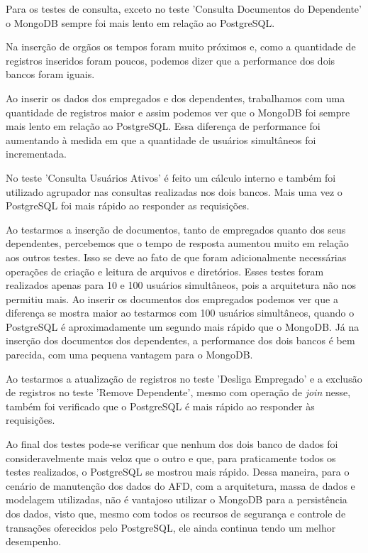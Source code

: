 Para os testes de consulta, exceto no teste 'Consulta Documentos do Dependente' o MongoDB sempre foi mais lento em relação ao PostgreSQL.

Na inserção de orgãos os tempos foram muito próximos e, como a quantidade de registros inseridos foram poucos, podemos dizer que a performance dos dois bancos foram iguais.

Ao inserir os dados dos empregados e dos dependentes, trabalhamos com uma quantidade de registros maior e assim podemos ver que o MongoDB foi sempre mais lento em relação ao PostgreSQL. Essa diferença de performance foi aumentando à medida em que a quantidade de usuários simultâneos foi incrementada.

No teste 'Consulta Usuários Ativos' é feito um cálculo interno e também foi utilizado agrupador nas consultas realizadas nos dois bancos. Mais uma vez o PostgreSQL foi mais rápido ao responder as requisições.

Ao testarmos a inserção de documentos, tanto de empregados quanto dos seus dependentes, percebemos que o tempo de resposta aumentou muito em relação aos outros testes. Isso se deve ao fato de que foram adicionalmente necessárias operações de criação e leitura de arquivos e diretórios. Esses testes foram realizados apenas para 10 e 100 usuários simultâneos, pois a arquitetura não nos permitiu mais. Ao inserir os documentos dos empregados podemos ver que a diferença se mostra maior ao testarmos com 100 usuários simultâneos, quando o PostgreSQL é aproximadamente um segundo mais rápido que o MongoDB. Já na inserção dos documentos dos dependentes, a performance dos dois bancos é bem parecida, com uma pequena vantagem para o MongoDB.

Ao testarmos a atualização de registros no teste 'Desliga Empregado' e a exclusão de registros no teste 'Remove Dependente', mesmo com operação de \textit{join} nesse, também foi verificado que o PostgreSQL é mais rápido ao responder às requisições.

Ao final dos testes pode-se verificar que nenhum dos dois banco de dados foi consideravelmente mais veloz que o outro e que, para praticamente todos os testes realizados, o PostgreSQL se mostrou mais rápido. Dessa maneira, para o cenário de manutenção dos dados do AFD, com a arquitetura, massa de dados e modelagem utilizadas, não é vantajoso utilizar o MongoDB para a persistência dos dados, visto que, mesmo com todos os recursos de segurança e controle de transações oferecidos pelo PostgreSQL, ele ainda continua tendo um melhor desempenho.


